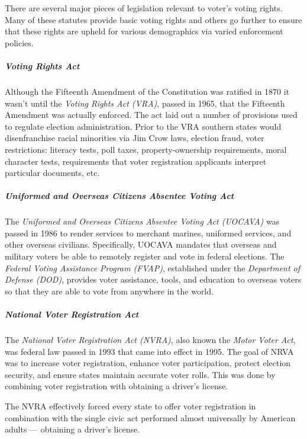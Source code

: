 There are several major pieces of legislation relevant to voter's voting rights.
Many of these statutes provide basic voting rights and others go further to
ensure that these rights are upheld for various demographics via varied
enforcement policies.

\subparagraph{Voting Rights Act}
Although the Fifteenth Amendment of the Constitution was ratified in 1870 it
wasn't until the \emph{Voting Rights Act (VRA)}, passed in 1965, that the
Fifteenth Amendment was actually enforced. The act laid out a number of
provisions used to regulate election administration. Prior to the VRA southern
states would disenfranchise racial minorities via Jim Crow laws, election fraud,
voter restrictions: literacy tests, poll taxes, property-ownership requirements,
moral character tests, requirements that voter registration applicants interpret
particular documents, etc.

\subparagraph{Uniformed and Overseas Citizens Absentee Voting Act}
The \emph{Uniformed and Overseas Citizens Absentee Voting Act (UOCAVA)} was
passed in 1986 to render services to merchant marines, uniformed services, and
other overseas civilians. Specifically, UOCAVA mandates that overseas and
military voters be able to remotely register and vote in federal elections. The
\emph{Federal Voting Assistance Program (FVAP)}, established under the
\emph{Department of Defense (DOD)}, provides voter assistance, tools, and
education to overseas voters so that they are able to vote from anywhere in the
world.

\subparagraph{National Voter Registration Act}
The \emph{National Voter Registration Act (NVRA)}, also known the
\emph{Motor Voter Act}, was federal law passed in 1993 that came into effect
in 1995. The goal of NRVA was to increase voter registration, enhance voter
participation, protect election security, and ensure states maintain accurate
voter rolls. This was done by combining voter registration with obtaining a
driver's license.

\begin{displayquote}
  The NVRA effectively forced every state to offer voter registration in
  combination with the single civic act performed almost universally by American
  adults --- obtaining a driver’s license.
\end{displayquote}


